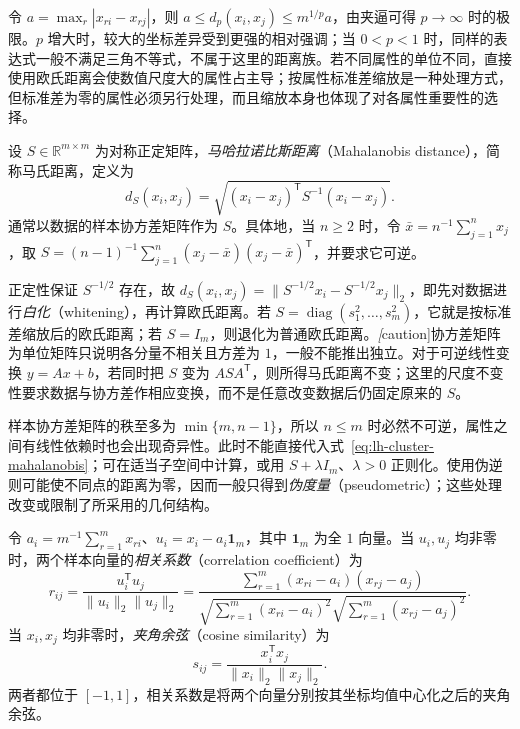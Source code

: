 令 $a=\max_r|x_{ri}-x_{rj}|$，则 $a\leq d_p(x_i,x_j)\leq m^{1/p}a$，由夹逼可得 $p\to\infty$ 时的极限。$p$ 增大时，较大的坐标差异受到更强的相对强调；当 $0<p<1$ 时，同样的表达式一般不满足三角不等式，不属于这里的距离族。若不同属性的单位不同，直接使用欧氏距离会使数值尺度大的属性占主导；按属性标准差缩放是一种处理方式，但标准差为零的属性必须另行处理，而且缩放本身也体现了对各属性重要性的选择。

\begin{definition}[马哈拉诺比斯距离]
\label{def:lh-cluster-mahalanobis}
设 $S\in\mathbb R^{m\times m}$ 为对称正定矩阵，\emph{马哈拉诺比斯距离}（Mahalanobis distance），简称马氏距离，定义为
\begin{equation}
d_S(x_i,x_j)=\sqrt{(x_i-x_j)^{\mathsf T}S^{-1}(x_i-x_j)}.
\label{eq:lh-cluster-mahalanobis}
\end{equation}
通常以数据的样本协方差矩阵作为 $S$。具体地，当 $n\geq2$ 时，令 $\bar x=n^{-1}\sum_{j=1}^n x_j$，取 $S=(n-1)^{-1}\sum_{j=1}^n(x_j-\bar x)(x_j-\bar x)^{\mathsf T}$，并要求它可逆。
\end{definition}

正定性保证 $S^{-1/2}$ 存在，故 $d_S(x_i,x_j)=\|S^{-1/2}x_i-S^{-1/2}x_j\|_2$，即先对数据进行\emph{白化}（whitening），再计算欧氏距离。若 $S=\operatorname{diag}(s_1^2,\ldots,s_m^2)$，它就是按标准差缩放后的欧氏距离；若 $S=I_m$，则退化为普通欧氏距离。\emph[caution]{协方差矩阵为单位矩阵只说明各分量不相关且方差为 $1$，一般不能推出独立。}对于可逆线性变换 $y=Ax+b$，若同时把 $S$ 变为 $ASA^{\mathsf T}$，则所得马氏距离不变；这里的尺度不变性要求数据与协方差作相应变换，而不是任意改变数据后仍固定原来的 $S$。

样本协方差矩阵的秩至多为 $\min\{m,n-1\}$，所以 $n\leq m$ 时必然不可逆，属性之间有线性依赖时也会出现奇异性。此时不能直接代入式~\eqref{eq:lh-cluster-mahalanobis}；可在适当子空间中计算，或用 $S+\lambda I_m$、$\lambda>0$ 正则化。使用伪逆则可能使不同点的距离为零，因而一般只得到\emph{伪度量}（pseudometric）；这些处理改变或限制了所采用的几何结构。

\begin{definition}[相关系数与夹角余弦]
\label{def:lh-cluster-correlation-cosine}
令 $a_i=m^{-1}\sum_{r=1}^m x_{ri}$、$u_i=x_i-a_i\mathbf1_m$，其中 $\mathbf1_m$ 为全 $1$ 向量。当 $u_i,u_j$ 均非零时，两个样本向量的\emph{相关系数}（correlation coefficient）为
\begin{equation}
r_{ij}=\frac{u_i^{\mathsf T}u_j}{\|u_i\|_2\|u_j\|_2}
=\frac{\sum_{r=1}^m(x_{ri}-a_i)(x_{rj}-a_j)}
{\sqrt{\sum_{r=1}^m(x_{ri}-a_i)^2}\sqrt{\sum_{r=1}^m(x_{rj}-a_j)^2}}.
\label{eq:lh-cluster-correlation}
\end{equation}
当 $x_i,x_j$ 均非零时，\emph{夹角余弦}（cosine similarity）为
\begin{equation}
s_{ij}=\frac{x_i^{\mathsf T}x_j}{\|x_i\|_2\|x_j\|_2}.
\label{eq:lh-cluster-cosine}
\end{equation}
两者都位于 $[-1,1]$，相关系数是将两个向量分别按其坐标均值中心化之后的夹角余弦。
\end{definition}

